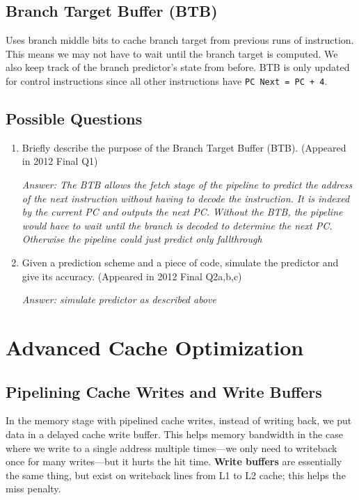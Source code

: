 \documentclass{article}
\begin{document}
\subsection{Branch Target Buffer (BTB)}

Uses branch middle bits to cache branch target from previous runs of instruction. This means we may not have to wait until the branch target is computed. We also keep track of the branch predictor's state from before. BTB is only updated for control instructions since all other instructions have \texttt{PC Next = PC + 4}.

\subsection{Possible Questions}

\begin{enumerate}

\item Briefly describe the purpose of the Branch Target Buffer (BTB). (Appeared in 2012 Final Q1)

\textit{Answer: The BTB allows the fetch stage of the pipeline to predict the address of the next instruction without having to decode the instruction. It is indexed by the current PC and outputs the next PC. Without the BTB, the pipeline would have to wait until the branch is decoded to determine the next PC. Otherwise the pipeline could just predict only fallthrough}

\item Given a prediction scheme and a piece of code, simulate the predictor and give its accuracy. (Appeared in 2012 Final Q2a,b,c)

\textit{Answer: simulate predictor as described above}

\end{enumerate}

\section{Advanced Cache Optimization}

\subsection{Pipelining Cache Writes and Write Buffers}

In the memory stage with pipelined cache writes, instead of writing back, we put data in a delayed cache write buffer. This helps memory bandwidth in the case where we write to a single address multiple times---we only need to writeback once for many writes---but it hurts the hit time. \textbf{Write buffers} are essentially the same thing, but exist on writeback lines from L1 to L2 cache; this helps the miss penalty.
\end{document}
